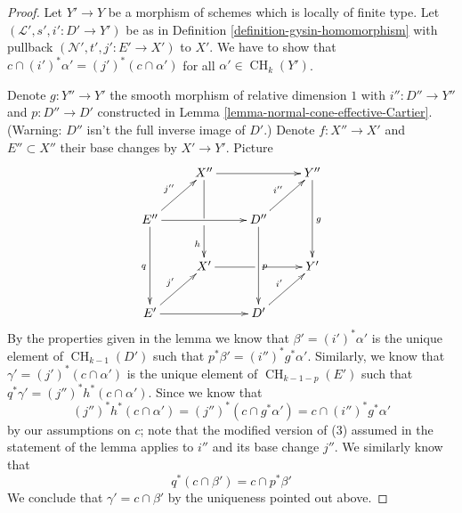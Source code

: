 \documentclass[10pt,a4paper]{amsart}
\theoremstyle{plain}
\theoremstyle{definition}
\theoremstyle{remark}
\numberwithin{equation}{subsection}
\def\CH{\mathop{\mathrm{CH}}\nolimits}
\begin{document}
\begin{proof}
Let $Y' \to Y$ be a morphism of schemes which is locally of finite type.
Let $(\mathcal{L}', s', i' : D' \to Y')$ be as in
Definition \ref{definition-gysin-homomorphism}
with pullback $(\mathcal{N}', t', j' : E' \to X')$ to $X'$.
We have to show that $c \cap (i')^*\alpha' = (j')^*(c \cap \alpha')$
for all $\alpha' \in \CH_k(Y')$.

\medskip\noindent
Denote $g : Y'' \to Y'$ the smooth morphism of relative
dimension $1$ with $i'' : D'' \to Y''$ and $p : D'' \to D'$
constructed in Lemma \ref{lemma-normal-cone-effective-Cartier}.
(Warning: $D''$ isn't the full inverse image of $D'$.)
Denote $f : X'' \to X'$ and $E'' \subset X''$
their base changes by $X' \to Y'$. Picture
$$
\xymatrix{
& X'' \ar[rr] \ar'[d][dd]_h & & Y'' \ar[dd]^g \\
E'' \ar[rr] \ar[dd]_q \ar[ru]^{j''} & & D'' \ar[dd]^p \ar[ru]^{i''} & \\
& X' \ar'[r][rr] & & Y' \\
E' \ar[rr] \ar[ru]^{j'} & & D' \ar[ru]^{i'}
}
$$
By the properties given in the lemma we know that $\beta' = (i')^*\alpha'$
is the unique element of $\CH_{k - 1}(D')$ such that
$p^*\beta' = (i'')^*g^*\alpha'$. Similarly, we know that
$\gamma' = (j')^*(c \cap \alpha')$ is the unique element of
$\CH_{k - 1 - p}(E')$ such that $q^*\gamma' = (j'')^*h^*(c \cap \alpha')$.
Since we know that
$$
(j'')^*h^*(c \cap \alpha') =
(j'')^*(c \cap g^*\alpha') =
c \cap (i'')^*g^*\alpha'
$$
by our assumptions on $c$; note that the modified version of (3)
assumed in the statement of the lemma applies to $i''$
and its base change $j''$. We similarly know that
$$
q^*(c \cap \beta') = c \cap p^*\beta'
$$
We conclude that $\gamma' = c \cap \beta'$ by the uniqueness pointed
out above.
\end{proof}
\end{document}
